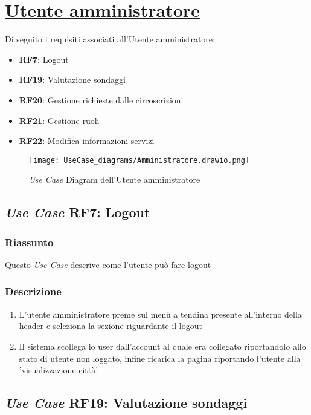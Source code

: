 \section{\underline{Utente amministratore}}
    Di seguito i requisiti associati all'Utente amministratore:
    \begin{itemize}
        \item \textbf{RF7}: Logout
        \item \textbf{RF19}: Valutazione sondaggi
        \item \textbf{RF20}: Gestione richieste dalle circoscrizioni
        \item \textbf{RF21}: Gestione ruoli
        \item \textbf{RF22}: Modifica informazioni servizi
    \end{itemize}
    \begin{figure}[H]
        \centering
        \texttt{[image: UseCase\_diagrams/Amministratore.drawio.png]}
        \caption{\textit{Use Case} Diagram dell'Utente amministratore}
    \end{figure}

    \subsection{\textit{Use Case} RF7: Logout}
        \subsubsection{Riassunto}
            Questo \textit{Use Case} descrive come l'utente può fare logout
        \subsubsection{Descrizione}
            \begin{enumerate}
                \item L'utente amministratore preme sul menù a tendina presente all'interno della header e seleziona la sezione riguardante il logout
                \item Il sistema scollega lo user dall'account al quale era collegato riportandolo allo stato di utente non loggato, infine 
                ricarica la pagina riportando l'utente alla 'visualizzazione città'
            \end{enumerate}

    \subsection{\textit{Use Case} RF19: Valutazione sondaggi}
